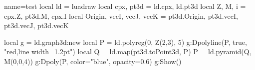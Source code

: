 \documentclass{article}
\newcommand*{\shortcuts}{%
local ld = luadraw
local cpx, pt3d = ld.cpx, ld.pt3d
local Z, M, i = cpx.Z, pt3d.M, cpx.I
local Origin, vecI, vecJ, vecK = pt3d.Origin, pt3d.vecI, pt3d.vecJ, pt3d.vecK
}%
\begin{document}
\begin{luadraw}{name=test}
\shortcuts
local g = ld.graph3d:new{}
local P = ld.polyreg(0, Z(2,3), 5)
g:Dpolyline(P, true, "red,line width=1.2pt")
local Q = ld.map(pt3d.toPoint3d, P)
P = ld.pyramid(Q, M(0,0,4))
g:Dpoly(P, {color="blue", opacity=0.6})
g:Show()
\end{luadraw}
\end{document}
